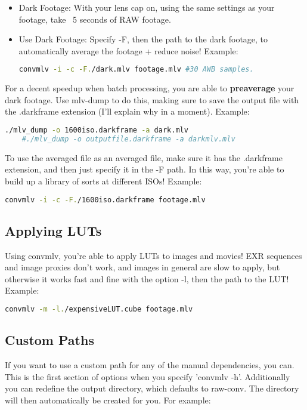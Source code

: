 \documentclass[a4paper,12pt]{article}
\begin{document}
		\begin{itemize}
			\item Dark Footage: With your lens cap on, using the same settings as your footage, take ~5 seconds of RAW footage.
			\item Use Dark Footage: Specify -F, then the path to the dark footage, to automatically average the footage + reduce noise! Example:
\begin{lstlisting}[language=bash]
	convmlv -i -c -F./dark.mlv footage.mlv #30 AWB samples.
\end{lstlisting}
		\end{itemize}
		
		For a decent speedup when batch processing, you are able to \textbf{preaverage} your dark footage. Use mlv-dump to do this, making
		sure to save the output file with the .darkframe extension (I'll explain why in a moment). Example:
		
\begin{lstlisting}[language=bash]
	./mlv_dump -o 1600iso.darkframe -a dark.mlv
	#./mlv_dump -o outputfile.darkframe -a darkmlv.mlv
\end{lstlisting}
		
		To use the averaged file as an averaged file, make sure it has the .darkframe extension, and then just specify it in the -F path. In
		this way, you're able to build up a library of sorts at different ISOs! Example:
		
\begin{lstlisting}[language=bash]
	convmlv -i -c -F./1600iso.darkframe footage.mlv
\end{lstlisting}
	
	\subsection{Applying LUTs}
		Using convmlv, you're able to apply LUTs to images and movies! EXR sequences and image proxies don't work, and images
		in general are slow to apply, but otherwise it works fast and fine with the option -l, then the path to the LUT! Example:
		
\begin{lstlisting}[language=bash]
	convmlv -m -l./expensiveLUT.cube footage.mlv
\end{lstlisting}
	
	\subsection{Custom Paths}
		If you want to use a custom path for any of the manual dependencies, you can. This is the first section of options when you
		specify 'convmlv -h'. Additionally you can redefine the output directory, which defaults to raw-conv. The
		directory will then automatically be created for you. For example:
		
\end{document}
